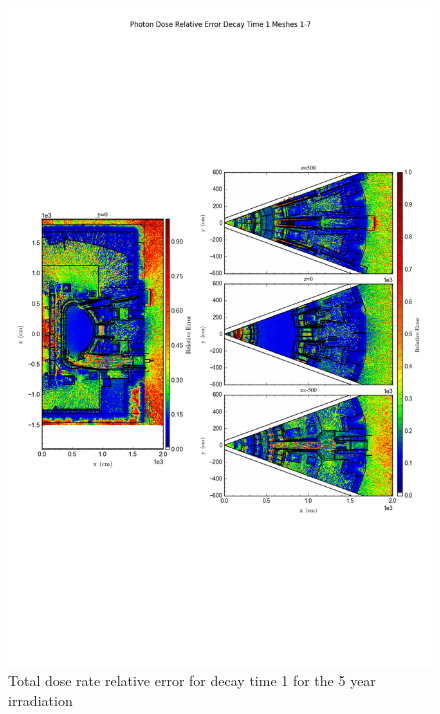 \documentclass[12pt]{article}
\begin{document}
\begin{figure}[ht!]
\centering
\includegraphics[trim={0cm 8cm, 0cm 8cm},clip,scale=0.75]{../plots/final_model_with_b4c/5year/Photon_Dose_Relative_Error_Decay_Time_1_Meshes_1-7.png}
\caption{Total dose rate relative error for decay time 1 for the 5 year irradiation}
\label{fig:photons_5y_dc1_nob4c_relerr}
\end{figure}
\clearpage
\end{document}
